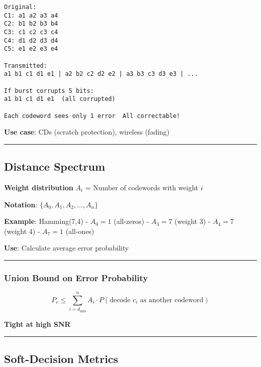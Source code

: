 \begin{verbatim}
Original:
C1: a1 a2 a3 a4
C2: b1 b2 b3 b4
C3: c1 c2 c3 c4
C4: d1 d2 d3 d4
C5: e1 e2 e3 e4

Transmitted:
a1 b1 c1 d1 e1 | a2 b2 c2 d2 e2 | a3 b3 c3 d3 e3 | ...

If burst corrupts 5 bits:
a1 b1 c1 d1 e1  (all corrupted)
         
Each codeword sees only 1 error  All correctable!
\end{verbatim}

\textbf{Use case}: CDs (scratch protection), wireless (fading)

\begin{center}\rule{0.5\linewidth}{0.5pt}\end{center}

\subsection{Distance Spectrum}\label{distance-spectrum}

\textbf{Weight distribution} \(A_i\) = Number of codewords with weight
\(i\)

\textbf{Notation}: \(\{A_0, A_1, A_2, \ldots, A_n\}\)

\textbf{Example}: Hamming(7,4) - \(A_0 = 1\) (all-zeros) - \(A_3 = 7\)
(weight 3) - \(A_4 = 7\) (weight 4) - \(A_7 = 1\) (all-ones)

\textbf{Use}: Calculate average error probability

\begin{center}\rule{0.5\linewidth}{0.5pt}\end{center}

\subsubsection{Union Bound on Error
Probability}\label{union-bound-on-error-probability}

\[
P_e \leq \sum_{i=d_{\min}}^{n} A_i \cdot P(\text{decode } c_i \text{ as another codeword})
\]

\textbf{Tight at high SNR}

\begin{center}\rule{0.5\linewidth}{0.5pt}\end{center}

\subsection{Soft-Decision Metrics}\label{soft-decision-metrics}

